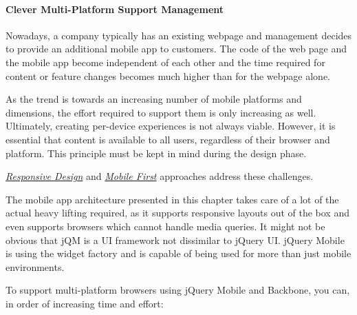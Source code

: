 \documentclass[9pt]{book}
\begin{document}
\paragraph{Clever Multi-Platform Support
Management}\label{clever-multi-platform-support-management}

Nowadays, a company typically has an existing webpage and management
decides to provide an additional mobile app to customers. The code of
the web page and the mobile app become independent of each other and the
time required for content or feature changes becomes much higher than
for the webpage alone.

As the trend is towards an increasing number of mobile platforms and
dimensions, the effort required to support them is only increasing as
well. Ultimately, creating per-device experiences is not always viable.
However, it is essential that content is available to all users,
regardless of their browser and platform. This principle must be kept in
mind during the design phase.

\emph{\href{http://www.lukew.com/ff/entry.asp?933}{Responsive Design}}
and \emph{\href{http://www.abookapart.com/products/mobile-first}{Mobile
First}} approaches address these challenges.

The mobile app architecture presented in this chapter takes care of a
lot of the actual heavy lifting required, as it supports responsive
layouts out of the box and even supports browsers which cannot handle
media queries. It might not be obvious that jQM is a UI framework not
dissimilar to jQuery UI. jQuery Mobile is using the widget factory and
is capable of being used for more than just mobile environments.

To support multi-platform browsers using jQuery Mobile and Backbone, you
can, in order of increasing time and effort:
\end{document}
